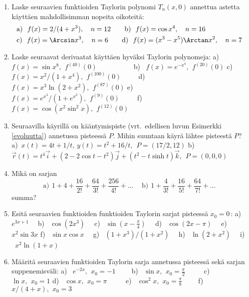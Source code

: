 \begin{enumerate}
\item
Laske seuraavien funktioiden Taylorin polynomi $T_n(x,0)$ annettua astetta käyttäen 
mahdollisimman nopeita oikoteitä:
\begin{align*}
&\text{a)}\ \ f(x)=2/(4+x^3), \quad n=12 \qquad
 \text{b)}\ \ f(x)=\cos x^4, \quad n=16 \\
&\text{c)}\ \ f(x)=\Arcsin x^3,\quad n=6 \qquad
 \text{d)}\ \ f(x)=(x^3-x^5)\Arctan x^2, \quad n=7
\end{align*}

\item
Laske seuraavat derivaatat käyttäen hyväksi Taylorin polynomeja:
\newline
a) \ $f(x)=\sin x^8,\,\ f^{(40)}(0)\qquad\qquad\quad$ 
b) \ $f(x)=e^{-x^4},\,\ f^{(20)}(0)$ \newline
c) \ $f(x)=x^2/(1+x^4),\,\ f^{(100)}(0)\qquad\,$
d) \ $f(x)=x^3\ln(2+x^2),\,\ f^{(87)}(0)$ \newline
e) \ $f(x)=e^{x^3}/(1+e^{x^3}),\,\ f^{(9)}(0)\qquad\ $
f) \ $f(x)=\cos(x^2\sin^2 x),\,\ f^{(12)}(0)$ 

\item
Seuraavilla käyrillä on kääntymispiste (vrt.\ edellisen luvun Esimerkki \ref{evoluutta})
annetussa pisteessä $P$. Mihin suuntaan käyrä lähtee pisteestä $P$? \vspace{1mm}\newline
a)\ $x(t)=4t+1/t,\ y(t)=t^2+16/t,\ \ P=(17/2,12)$ \newline
b)\ $\vec r(t) = t^4\vec i + (2-2\cos t - t^2)\vec j + (t^2-t\sinh t)\vec k,\ \ P=(0,0,0)$

\item
Mikä on sarjan
\[
\text{a)}\,\ 1+4+\frac{16}{2!}+\frac{64}{3!}+\frac{256}{4!}+ \ldots \quad\
\text{b)}\,\ 1+\frac{4}{3!}+\frac{16}{5!}+\frac{64}{7!}+ \ldots  
\]
summa?

\item
Esitä seuraavien funktioiden funktioiden Taylorin sarjat
pisteessä $x_0=0\,$: \vspace{1mm}\newline
a) \ $e^{3x+1}\quad$ 
b) \ $\cos(2x^3)\quad$ 
c) \ $\sin(x-\frac{\pi}{4})\quad$ 
d) \ $\cos(2x-\pi)\quad$ 
e) \ $x^2\sin 3x$\vspace{1mm}\newline
f) \ $\sin x\cos x\quad$ 
g) \ $(1+x^3)/(1+x^2)\quad$ 
h) \ $\ln(2+x^2)\quad$ 
i) \ $x^2\ln(1+x)$

\item
Määritä seuraavien funktioiden Taylorin sarja annetussa pisteessä sekä sarjan
suppenemisväli: \vspace{1mm}\newline
a) \ $e^{-2x},\,\ x_0=-1 \qquad$
b) \ $\sin x,\,\ x_0=\tfrac{\pi}{2} \qquad\,\ $
c) \ $\ln x,\,\ x_0=1$ \newline
d) \ $\cos x,\,\ x_0=\pi \qquad\,\ $
e) \ $\cos^2 x,\,\ x_0=\tfrac{\pi}{8} \qquad$ 
f) \ $x/(4+x),\,\ x_0=3$


\end{enumerate}
